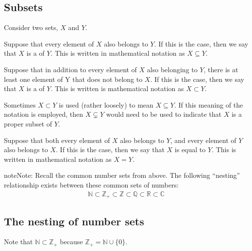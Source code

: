 \documentclass[letterpaper,10pt,english]{jupyterBook}
\begin{document}
\subsection{Subsets}
\label{\detokenize{02.sets_numbers_coordinates_distances:subsets}}
\sphinxAtStartPar
Consider two sets, \(X\) and \(Y\).

\sphinxAtStartPar
Suppose that every element of \(X\) also belongs to \(Y\). If this is the case, then we say that \(X\) is a  of \(Y\). This is written in mathematical notation as \(X \subseteq Y\).

\sphinxAtStartPar
Suppose that in addition to every element of \(X\) also belonging to \(Y\), there is at least one element of Y that does not belong to \(X\). If this is the case, then we say that \(X\) is a  of \(Y\). This is written is mathematical notation as \(X \subset Y\).

\sphinxAtStartPar
Sometimes \(X \subset Y\) is used (rather loosely) to mean \(X \subseteq Y\). If this meaning of the notation is employed, then \(X \subsetneq Y\) would need to be used to indicate that \(X\) is a proper subset of \(Y\).

\sphinxAtStartPar
Suppose that both every element of \(X\) also belongs to \(Y\), and every element of \(Y\) also belongs to \(X\). If this is the case, then we say that \(X\) is equal to \(Y\). This is written in mathematical notation as \(X = Y\).

\begin{sphinxadmonition}{note}{Note:}
\sphinxAtStartPar
Recall the common number sets from above. The following “nesting” relationship exists between these common sets of numbers:
\begin{equation*}
\begin{split}\mathbb{N} \subset \mathbb{Z}_+ \subset \mathbb{Z} \subset \mathbb{Q} \subset \mathbb{R} \subset \mathbb{C}\end{split}
\end{equation*}\end{sphinxadmonition}


\subsection{The nesting of number sets}
\label{\detokenize{02.sets_numbers_coordinates_distances:the-nesting-of-number-sets}}
\sphinxAtStartPar
Note that \(\mathbb{N} \subset \mathbb{Z}_+\) because \(\mathbb{Z}_+ = \mathbb{N} \cup \{0\}\).
\end{document}
